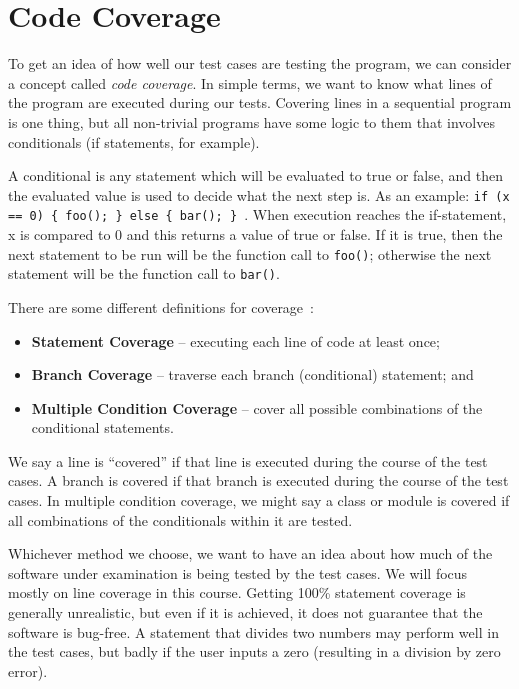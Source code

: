 




\section*{Code Coverage}
To get an idea of how well our test cases are testing the program, we can consider a concept called \textit{code coverage}. In simple terms, we want to know what lines of the program are executed during our tests. Covering lines in a sequential program is one thing, but all non-trivial programs have some logic to them that involves conditionals (if statements, for example). 

A conditional is any statement which will be evaluated to true or false, and then the evaluated value is used to decide what the next step is. As an example: \texttt{if (x == 0) \{ foo(); \} else \{ bar(); \} }. When execution reaches the if-statement, x is compared to 0 and this returns a value of true or false. If it is true, then the next statement to be run will be the function call to \texttt{foo()}; otherwise the next statement will be the function call to \texttt{bar()}.

There are some different definitions for coverage~\cite{pantest}:
\begin{itemize}
	\item \textbf{Statement Coverage} -- executing each line of code at least once;
	\item \textbf{Branch Coverage} -- traverse each branch (conditional) statement; and
	\item \textbf{Multiple Condition Coverage} -- cover all possible combinations of the conditional statements.
\end{itemize}

We say a line is ``covered'' if that line is executed during the course of the test cases. A branch is covered if that branch is executed during the course of the test cases. In multiple condition coverage, we might say a class or module is covered if all combinations of the conditionals within it are tested.

Whichever method we choose, we want to have an idea about how much of the software under examination is being tested by the test cases. We will focus mostly on line coverage in this course. Getting 100\% statement coverage is generally unrealistic, but even if it is achieved, it does not guarantee that the software is bug-free. A statement that divides two numbers may perform well in the test cases, but badly if the user inputs a zero (resulting in a division by zero error). 

